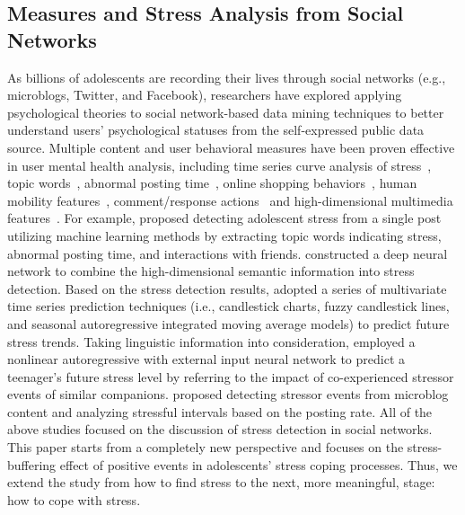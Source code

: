 \documentclass[5p,times,numbers,authoryear]{elsarticle}
\begin{document}
\subsection{Measures and Stress Analysis from Social Networks}
As billions of adolescents are recording their lives through social networks (e.g., microblogs, Twitter, and Facebook), researchers have explored applying psychological theories to social network-based data mining techniques to better understand users' psychological statuses from the self-expressed public data source.
Multiple content and user behavioral measures have been 
{proven} 
effective in user mental health analysis,
including time series curve analysis of stress~\citep{Li2015When,Li2015Using}, topic words~\citep{XueUbicomp13}, abnormal posting time~\citep{Xue2014Detecting},
online shopping behaviors~\citep{DBLP:conf/apweb/Zhao0XLF16},
human mobility features~\citep{DBLP:conf/dasfaa/JinXLF16}, comment/response actions~\citep{Liang2015Teenagers}
and high-dimensional multimedia features~\citep{Lin2014User}.
For example, \citep{XueUbicomp13, Xue2014Detecting} proposed detecting adolescent stress from a single post utilizing machine learning methods by extracting topic words indicating stress, abnormal posting time, and interactions with friends.
\citep{Lin2014User} constructed a deep neural network to combine the high-dimensional   semantic information into stress detection.
Based on the stress detection results,
\citep{Li2015Predicting}\cite{Li2015Using}\cite{Li2015When} adopted a series of multivariate time series prediction techniques (i.e., candlestick charts, fuzzy candlestick lines, and seasonal autoregressive integrated moving average models) to predict future stress trends.
Taking  linguistic information into consideration,
\citep{Li2017Exploring} employed a nonlinear autoregressive with external input neural network to predict a teenager's future stress level by referring to the impact of co-experienced stressor events of similar companions.
\citep{Li2017Analyzing} proposed detecting stressor events from microblog content
and analyzing stressful intervals based on the posting rate.
All of the above studies focused on the discussion of stress detection in social networks.
This paper starts from a completely new perspective and focuses on the stress-buffering effect of positive events in adolescents' stress coping processes.
Thus, we extend the study from how to find stress to the next, more meaningful, stage: how to cope with stress.
\end{document}
